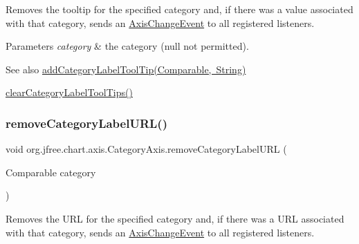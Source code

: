 Removes the tooltip for the specified category and, if there was a value associated with that category, sends an \mbox{\hyperlink{}{Axis\+Change\+Event}} to all registered listeners.


\begin{DoxyParams}{Parameters}
{\em category} & the category ({\ttfamily null} not permitted).\\
\hline
\end{DoxyParams}
\begin{DoxySeeAlso}{See also}
\mbox{\hyperlink{classorg_1_1jfree_1_1chart_1_1axis_1_1_category_axis_af13a9e516099c2898e94ccc1196a105e}{add\+Category\+Label\+Tool\+Tip(\+Comparable, String)}} 

\mbox{\hyperlink{classorg_1_1jfree_1_1chart_1_1axis_1_1_category_axis_ac759f3965ef290addcff7b607c559a3e}{clear\+Category\+Label\+Tool\+Tips()}} 
\end{DoxySeeAlso}
\mbox{\label{classorg_1_1jfree_1_1chart_1_1axis_1_1_category_axis_a37bd2f2448d6ba0903b8b4d0ee98adf4}} 
\subsubsection{\texorpdfstring{remove\+Category\+Label\+U\+R\+L()}{removeCategoryLabelURL()}}
{\footnotesize\ttfamily void org.\+jfree.\+chart.\+axis.\+Category\+Axis.\+remove\+Category\+Label\+U\+RL (\begin{DoxyParamCaption}\item[{Comparable}]{category }\end{DoxyParamCaption})}

Removes the U\+RL for the specified category and, if there was a U\+RL associated with that category, sends an \mbox{\hyperlink{}{Axis\+Change\+Event}} to all registered listeners.


